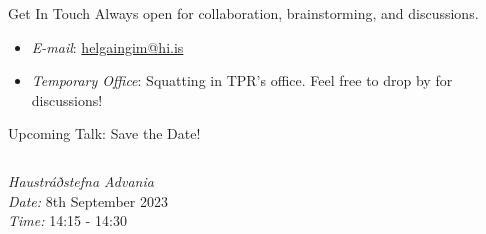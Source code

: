 \documentclass[
    NAME={Dr. Helga Ingimundardóttir},
    EMAIL={helgaingim@hi.is},
    FACULTY={Industrial Engineering},
    SUBTITLE={From Smart Algorithms in Fish Portioning to Pioneering Pipelines in Long-Range DNA Sequencing and Digital Travel},
    SEMINAR={IVT Faculty Gathering},
    DATE={September 6, 2023}
]{hi-latex/hi-beamer}
\begin{document}
\begin{frame}{Get In Touch}
Always open for collaboration, brainstorming, and discussions.

\bigskip

\begin{itemize}
        \item \emph{E-mail}: \href{mailto:helgaingim@hi.is}{helgaingim@hi.is}
        \item \emph{Temporary Office}: Squatting in TPR's office. Feel free to drop by for discussions!
    \end{itemize}
\end{frame}

\begin{frame}{Upcoming Talk: Save the Date!}
\begin{columns}
    \begin{column}{0.65\textwidth}
    \emph{Haustráðstefna Advania}\\
    \emph{Date:} 8th September 2023\\
    \emph{Time:} 14:15 - 14:30\\

\end{column}
\end{columns}
\end{frame}
\end{document}
